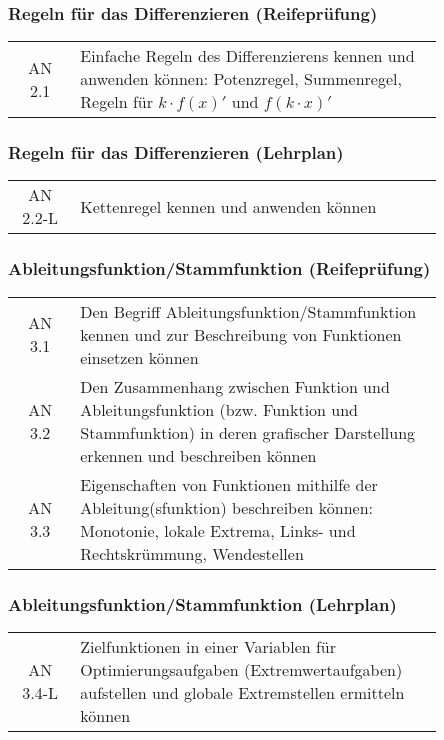 \documentclass[a4paper,12pt]{article}
\begin{document}
\subsubsection{Regeln für das Differenzieren (Reifeprüfung)}
\begin{tabular}{cp{0.85\linewidth}}
AN 2.1 & Einfache Regeln des Differenzierens kennen und anwenden können: Potenzregel, Summenregel, Regeln für $k\cdot f(x)'$ und $f(k\cdot x)'$\\
\end{tabular}


\subsubsection{Regeln für das Differenzieren (Lehrplan)}
\begin{em}
\begin{tabular}{cp{0.85\linewidth}}
AN 2.2-L & Kettenregel kennen und anwenden können
\end{tabular}
\end{em}


\subsubsection{Ableitungsfunktion/Stammfunktion (Reifeprüfung)}
\begin{tabular}{cp{0.85\linewidth}}
AN 3.1 & Den Begriff Ableitungsfunktion/Stammfunktion kennen und zur Beschreibung von Funktionen einsetzen können\\
AN 3.2 & Den Zusammenhang zwischen Funktion und Ableitungsfunktion (bzw. Funktion und Stammfunktion) in deren grafischer Darstellung erkennen und beschreiben können\\
AN 3.3 & Eigenschaften von Funktionen mithilfe der Ableitung(sfunktion) beschreiben können: Monotonie, lokale Extrema, Links- und Rechtskrümmung, Wendestellen\\  
\end{tabular}


\subsubsection{Ableitungsfunktion/Stammfunktion (Lehrplan)}

\begin{em}
\begin{tabular}{cp{0.85\linewidth}}
AN 3.4-L &  Zielfunktionen in einer Variablen für Optimierungsaufgaben (Extremwertaufgaben) aufstellen und globale Extremstellen ermitteln können\\
\end{tabular}
\end{em}
\end{document}
